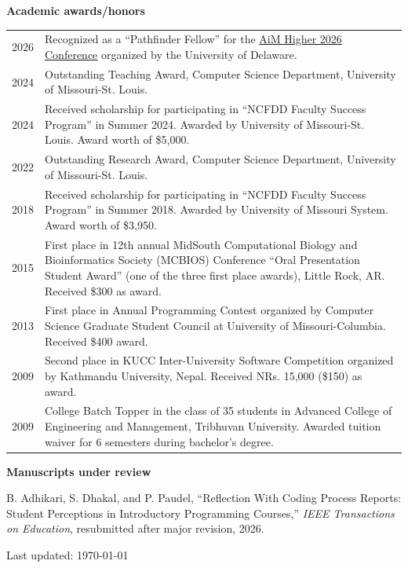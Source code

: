\documentclass[11pt]{article}
\begin{document}
\vspace{0.5cm}

\textbf{Academic awards/honors}

\vspace{0.5cm}

\begin{tabular}{ l >{\raggedright\arraybackslash}p{14cm} }
2026 & Recognized as a ``Pathfinder Fellow'' for the \href{https://sites.udel.edu/aim-higher/speakers-2026/}{AiM Higher 2026 Conference} organized by the University of Delaware. \\
2024 & Outstanding Teaching Award, Computer Science Department, University of Missouri-St. Louis. \\
2024 & Received scholarship for participating in ``NCFDD Faculty Success Program'' in Summer 2024. Awarded by University of Missouri-St. Louis. Award worth of \$5,000.\\
2022 & Outstanding Research Award, Computer Science Department, University of Missouri-St. Louis. \\
2018 & Received scholarship for participating in ``NCFDD Faculty Success Program'' in Summer 2018. Awarded by University of Missouri System. Award worth of \$3,950.\\
2015 & First place in 12th annual MidSouth Computational Biology and Bioinformatics Society (MCBIOS) Conference ``Oral Presentation Student Award” (one of the three first place awards), Little Rock, AR. Received \$300 as award.\\
2013 & First place in Annual Programming Contest organized by Computer Science Graduate Student Council at University of Missouri-Columbia. Received \$400 award.\\
2009 & Second place in KUCC Inter-University Software Competition organized by Kathmandu University, Nepal. Received NRs. 15,000 (\$150) as award.\\
2009 & College Batch Topper in the class of 35 students in Advanced College of Engineering and Management, Tribhuvan University. Awarded tuition waiver for 6 semesters during bachelor’s degree.
\end{tabular}

\newpage

\textbf{Manuscripts under review}

\vspace{0.3cm}

B. Adhikari, S. Dhakal, and P. Paudel, ``Reflection With Coding Process Reports: Student Perceptions in Introductory Programming Courses,'' \textit{IEEE Transactions on Education}, resubmitted after major revision, 2026.

\vspace{0.5cm}

\renewcommand*{\bibfont}{{\fontfamily{cmss}}}

\nocite{*}
\printbibliography[title=\fontfamily{cmss}{\textbf{\normalsize{Publications:}}}]

\vspace{0.2cm}
\small{Last updated: \today}
\end{document}

